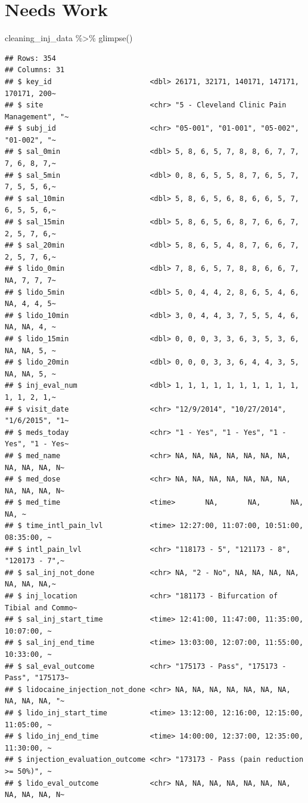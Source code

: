 \documentclass[
]{article}
\newenvironment{Shaded}{\begin{snugshade}}{\end{snugshade}}
\newcommand{\FunctionTok}[1]{\textcolor[rgb]{0.00,0.00,0.00}{#1}}
\newcommand{\NormalTok}[1]{#1}
\newcommand{\SpecialCharTok}[1]{\textcolor[rgb]{0.00,0.00,0.00}{#1}}
\begin{document}
\hypertarget{needs-work}{%
\section{Needs Work}\label{needs-work}}

\begin{Shaded}
\begin{Highlighting}[]
\NormalTok{cleaning\_inj\_data }\SpecialCharTok{\%\textgreater{}\%} \FunctionTok{glimpse}\NormalTok{()}
\end{Highlighting}
\end{Shaded}

\begin{verbatim}
## Rows: 354
## Columns: 31
## $ key_id                       <dbl> 26171, 32171, 140171, 147171, 170171, 200~
## $ site                         <chr> "5 - Cleveland Clinic Pain Management", "~
## $ subj_id                      <chr> "05-001", "01-001", "05-002", "01-002", "~
## $ sal_0min                     <dbl> 5, 8, 6, 5, 7, 8, 8, 6, 7, 7, 7, 6, 8, 7,~
## $ sal_5min                     <dbl> 0, 8, 6, 5, 5, 8, 7, 6, 5, 7, 7, 5, 5, 6,~
## $ sal_10min                    <dbl> 5, 8, 6, 5, 6, 8, 6, 6, 5, 7, 6, 5, 5, 6,~
## $ sal_15min                    <dbl> 5, 8, 6, 5, 6, 8, 7, 6, 6, 7, 2, 5, 7, 6,~
## $ sal_20min                    <dbl> 5, 8, 6, 5, 4, 8, 7, 6, 6, 7, 2, 5, 7, 6,~
## $ lido_0min                    <dbl> 7, 8, 6, 5, 7, 8, 8, 6, 6, 7, NA, 7, 7, 7~
## $ lido_5min                    <dbl> 5, 0, 4, 4, 2, 8, 6, 5, 4, 6, NA, 4, 4, 5~
## $ lido_10min                   <dbl> 3, 0, 4, 4, 3, 7, 5, 5, 4, 6, NA, NA, 4, ~
## $ lido_15min                   <dbl> 0, 0, 0, 3, 3, 6, 3, 5, 3, 6, NA, NA, 5, ~
## $ lido_20min                   <dbl> 0, 0, 0, 3, 3, 6, 4, 4, 3, 5, NA, NA, 5, ~
## $ inj_eval_num                 <dbl> 1, 1, 1, 1, 1, 1, 1, 1, 1, 1, 1, 1, 2, 1,~
## $ visit_date                   <chr> "12/9/2014", "10/27/2014", "1/6/2015", "1~
## $ meds_today                   <chr> "1 - Yes", "1 - Yes", "1 - Yes", "1 - Yes~
## $ med_name                     <chr> NA, NA, NA, NA, NA, NA, NA, NA, NA, NA, N~
## $ med_dose                     <chr> NA, NA, NA, NA, NA, NA, NA, NA, NA, NA, N~
## $ med_time                     <time>       NA,       NA,       NA,       NA, ~
## $ time_intl_pain_lvl           <time> 12:27:00, 11:07:00, 10:51:00, 08:35:00, ~
## $ intl_pain_lvl                <chr> "118173 - 5", "121173 - 8", "120173 - 7",~
## $ sal_inj_not_done             <chr> NA, "2 - No", NA, NA, NA, NA, NA, NA, NA,~
## $ inj_location                 <chr> "181173 - Bifurcation of Tibial and Commo~
## $ sal_inj_start_time           <time> 12:41:00, 11:47:00, 11:35:00, 10:07:00, ~
## $ sal_inj_end_time             <time> 13:03:00, 12:07:00, 11:55:00, 10:33:00, ~
## $ sal_eval_outcome             <chr> "175173 - Pass", "175173 - Pass", "175173~
## $ lidocaine_injection_not_done <chr> NA, NA, NA, NA, NA, NA, NA, NA, NA, NA, "~
## $ lido_inj_start_time          <time> 13:12:00, 12:16:00, 12:15:00, 11:05:00, ~
## $ lido_inj_end_time            <time> 14:00:00, 12:37:00, 12:35:00, 11:30:00, ~
## $ injection_evaluation_outcome <chr> "173173 - Pass (pain reduction >= 50%)", ~
## $ lido_eval_outcome            <chr> NA, NA, NA, NA, NA, NA, NA, NA, NA, NA, N~
\end{verbatim}
\end{document}
